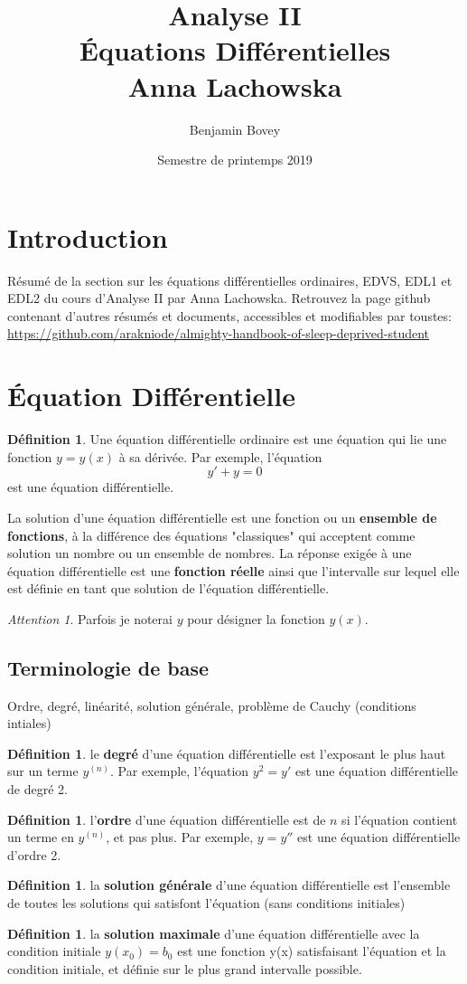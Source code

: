 \documentclass{article}
\title{Analyse II \\ Équations Différentielles \\ Anna Lachowska}
\author{Benjamin Bovey}
\date{Semestre de printemps 2019}
\theoremstyle{plain}
\theoremstyle{definition}
\newtheorem{defn}[thm]{Définition}
\theoremstyle{remark}
\newtheorem*{attention}{Attention}
\begin{document}
\section*{Introduction}
Résumé de la section sur les équations différentielles ordinaires, EDVS, EDL1 et EDL2 du cours d'Analyse II par Anna Lachowska. Retrouvez la page github contenant d'autres résumés et documents, accessibles et modifiables par toustes: \url{https://github.com/arakniode/almighty-handbook-of-sleep-deprived-student}

\section{Équation Différentielle}
\begin{defn}\label{def:equadiff}
Une équation différentielle ordinaire est une équation qui lie une fonction $y = y(x)$ à sa dérivée. Par exemple, l'équation
\begin{equation}
	y' + y = 0
\end{equation}
est une équation différentielle. 
\end{defn}
La solution d'une équation différentielle est une fonction ou un \textbf{ensemble de fonctions}, à la différence des équations "classiques" qui acceptent comme solution un nombre ou un ensemble de nombres. La réponse exigée à une équation différentielle est une \textbf{fonction réelle} ainsi que l'intervalle sur lequel elle est définie en tant que solution de l'équation différentielle.

\begin{attention}
	Parfois je noterai $y$ pour désigner la fonction $y(x)$.
\end{attention}

\subsection{Terminologie de base} %
Ordre, degré, linéarité, solution générale, problème de Cauchy (conditions intiales) \\
\begin{defn} le \textbf{degré} d'une équation différentielle est l'exposant le plus haut sur un terme $y^{(n)}$. Par exemple, l'équation $y^2 = y'$ est une équation différentielle de degré 2. 
\end{defn}
\begin{defn} l'\textbf{ordre} d'une équation différentielle est de $n$ si l'équation contient un terme en $y^{(n)}$, et pas plus. Par exemple, $y = y''$ est une équation différentielle d'ordre 2.
\end{defn}
\begin{defn} la \textbf{solution générale} d'une équation différentielle est l'ensemble de toutes les solutions qui satisfont l'équation (sans conditions initiales)
\end{defn}
\begin{defn} la \textbf{solution maximale} d'une équation différentielle avec la condition initiale $y(x_0) = b_0$ est une fonction y(x) satisfaisant l'équation et la condition initiale, et définie sur le plus grand intervalle possible.
\end{defn}
\end{document}
